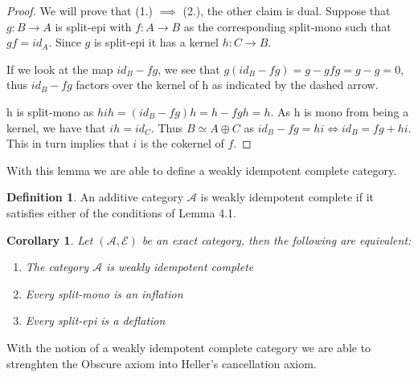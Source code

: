 \documentclass[11pt]{article}
\newtheorem{corollary}{Corollary}[theorem]
\theoremstyle{definition}
\newtheorem{definition}{Definition}[section]
\theoremstyle{remark}
\begin{document}
            \begin{proof}
                We will prove that (1.) $\implies$ (2.), the other claim is dual. Suppose that $g:B\rightarrow A$ is split-epi with $f:A\rightarrow B$ as the corresponding split-mono such that $gf=id_A$. Since $g$ is split-epi it has a kernel $h:C\rightarrow B$.
                
                \begin{center}
                \end{center}

                If we look at the map $id_B-fg$, we see that $g(id_B-fg)=g-gfg=g-g=0$, thus $id_B-fg$ factors over the kernel of h as indicated by the dashed arrow.

                h is split-mono as $hih = (id_B-fg)h=h-fgh=h$. As h is mono from being a kernel, we have that $ih=id_C$. Thus $B\simeq A\oplus C$ as $id_B -fg = hi \iff id_B = fg + hi$. This in turn implies that $i$ is the cokernel of $f$.
            \end{proof}

            With this lemma we are able to define a weakly idempotent complete category.

            \begin{definition}
                An additive category $\mathcal{A}$ is weakly idempotent complete if it satisfies either of the conditions of Lemma 4.1.
            \end{definition}

            \begin{corollary}
                Let $(\mathcal{A},\mathcal{E})$ be an exact category, then the following are equivalent:
                \begin{enumerate}
                    \item The category $\mathcal{A}$ is weakly idempotent complete
                    \item Every split-mono is an inflation
                    \item Every split-epi is a deflation
                \end{enumerate}
            \end{corollary}

            With the notion of a weakly idempotent complete category we are able to strenghten the Obscure axiom into Heller's cancellation axiom.
\end{document}
